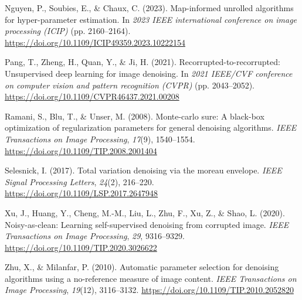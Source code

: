 \documentclass[
]{agujournal2019}
\newlength{\cslhangindent}
\newenvironment{CSLReferences}[2] %
 {\begin{list}{}{%
  \setlength{\itemindent}{0pt}
  \setlength{\leftmargin}{0pt}
  \setlength{\parsep}{0pt}
  \ifodd #1
   \setlength{\leftmargin}{\cslhangindent}
   \setlength{\itemindent}{-1\cslhangindent}
  \fi
  \setlength{\itemsep}{#2\baselineskip}}}
 {\end{list}}
\begin{document}
\begin{CSLReferences}{1}{0}
Nguyen, P., Soubies, E., \& Chaux, C. (2023). Map-informed unrolled
algorithms for hyper-parameter estimation. In \emph{2023 IEEE
international conference on image processing (ICIP)} (pp. 2160--2164).
\url{https://doi.org/10.1109/ICIP49359.2023.10222154}

Pang, T., Zheng, H., Quan, Y., \& Ji, H. (2021).
Recorrupted-to-recorrupted: Unsupervised deep learning for image
denoising. In \emph{2021 IEEE/CVF conference on computer vision and
pattern recognition (CVPR)} (pp. 2043--2052).
\url{https://doi.org/10.1109/CVPR46437.2021.00208}

Ramani, S., Blu, T., \& Unser, M. (2008). Monte-carlo sure: A black-box
optimization of regularization parameters for general denoising
algorithms. \emph{IEEE Transactions on Image Processing}, \emph{17}(9),
1540--1554. \url{https://doi.org/10.1109/TIP.2008.2001404}

Selesnick, I. (2017). Total variation denoising via the moreau envelope.
\emph{IEEE Signal Processing Letters}, \emph{24}(2), 216--220.
\url{https://doi.org/10.1109/LSP.2017.2647948}

Xu, J., Huang, Y., Cheng, M.-M., Liu, L., Zhu, F., Xu, Z., \& Shao, L.
(2020). Noisy-as-clean: Learning self-supervised denoising from
corrupted image. \emph{IEEE Transactions on Image Processing},
\emph{29}, 9316--9329. \url{https://doi.org/10.1109/TIP.2020.3026622}

Zhu, X., \& Milanfar, P. (2010). Automatic parameter selection for
denoising algorithms using a no-reference measure of image content.
\emph{IEEE Transactions on Image Processing}, \emph{19}(12), 3116--3132.
\url{https://doi.org/10.1109/TIP.2010.2052820}

\end{CSLReferences}
\end{document}
